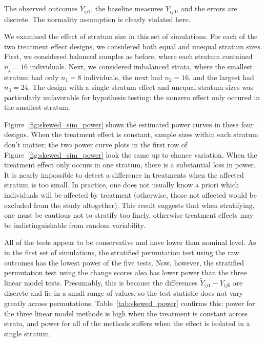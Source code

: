 \documentclass[12pt]{article}
\begin{document}
The observed outcomes $\tilde{Y}_{ij1}$, the baseline measures $Y_{ij0}$, and the errors are discrete.
The normality assumption is clearly violated here.

We examined the effect of stratum size in this set of simulations.
For each of the two treatment effect designs, we considered both equal and unequal stratum sizes.
First, we considered balanced samples as before, where each stratum contained $n_j = 16$ individuals.
Next, we considered imbalanced strata, where the smallest stratum had only $n_1=8$ individuals, the next had $n_2= 16$, and the largest had $n_3=24$.
The design with a single stratum effect and unequal stratum sizes was particularly unfavorable for hypothesis testing:
the nonzero effect only occured in the smallest stratum.

Figure~\ref{fig:skewed_sim_power} shows the estimated power curves in these four designs.
When the treatment effect is constant, sample sizes within each stratum don't matter; 
the two power curve plots in the first row of Figure~\ref{fig:skewed_sim_power} look the same up to chance variation.
When the treatment effect only occurs in one stratum, there is a substantial loss in power.
It is nearly impossible to detect a difference in treatments when the affected stratum is too small.
In practice, one does not usually know a priori which individuals will be affected by treatment (otherwise, those not affected would be excluded from the study altogether).
This result suggests that when stratifying, one must be cautious not to stratify too finely, otherwise treatment effects may be indistinguishable from random variability.

All of the tests appear to be conservative and have lower than nominal level.
As in the first set of simulations, the stratified permutation test using the raw outcomes has the lowest power of the five tests.
Now, however, the stratified permutation test using the change scores also has lower power than the three linear model tests.
Presumably, this is because the differences $\tilde{Y}_{ij1} - Y_{ij0}$ are discrete and lie in a small range of values, so the test statistic does not vary greatly across permutations.
Table~\ref{tab:skewed_power} confirms this: power for the three linear model methods is high when the treatment is constant across strata, and power for all of the methods suffers when the effect is isolated in a single stratum.
\end{document}
